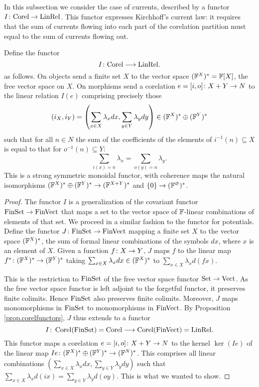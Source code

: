 In this subsection we consider the case of currents, described by a functor
$I{\colon} \mathrm{Corel} \to \mathrm{LinRel}$. This functor expresses Kirchhoff's
current law: it requires that the sum of currents flowing into each part of the
corelation partition must equal to the sum of currents flowing out.  
\begin{proposition}
  Define the functor
  \[
    I{\colon} \mathrm{Corel} \longrightarrow \mathrm{LinRel}.
  \]
  as follows. On objects send a finite set $X$ to the vector space
  $({\mathbb F}^{X})^\ast={\mathbb F}[X]$, the free vector space on $X$. On morphisms send a
  corelation $e=[i,o]{\colon} X +Y \to N$ to the linear relation $I(e)$ comprising precisely
  those 
  \[
    (i_X,i_Y) = \left(\sum_{x \in X} \lambda_xdx,\sum_{y \in Y}
    \lambda_ydy\right)  \in ({\mathbb F}^{X})^\ast \oplus ({\mathbb F}^{Y})^\ast
  \]
  such that for all $n \in N$ the sum of the coefficients of the elements
  of $i^{-1}(n) \subseteq X$ is equal to that for $o^{-1}(n) \subseteq Y$:
  \[
    \sum_{i(x)=n} \lambda_x = \sum_{o(y)=n} \lambda_y.
  \]
  This is a strong symmetric monoidal functor, with coherence maps the natural
  isomorphisms $({\mathbb F}^X)^\ast \oplus ({\mathbb F}^Y)^\ast \to ({\mathbb F}^{X+Y})^\ast$ and $\{0\}
  \to ({\mathbb F}^\varnothing)^\ast$.
\end{proposition}
\begin{proof}
  The functor $I$ is a generalization of the covariant functor $\mathrm{FinSet} \to
  \mathrm{FinVect}$ that maps a set to the vector space of ${\mathbb F}$-linear combinations of
  elements of that set. We proceed in a similar fashion to the functor for
  potentials. Define the functor $J{\colon} \mathrm{FinSet} \to \mathrm{FinVect}$ mapping a finite
  set $X$ to the vector space $({\mathbb F}^{X})^\ast$, the sum of formal linear
  combinations of the symbols $dx$, where $x$ is an element of $X$. Given a
  function $f{\colon} X \to Y$, $J$ maps $f$ to the linear map $f^\ast{\colon}
  ({\mathbb F}^X)^\ast \to ({\mathbb F}^Y)^\ast$ taking $\sum_{x \in X} \lambda_x dx \in
  ({\mathbb F}^X)^\ast$ to $\sum_{x \in X} \lambda_xd(fx)$.  

  This is the restriction to $\mathrm{FinSet}$ of the free vector space functor $\mathrm{Set}
  \to \mathrm{Vect}$. As the free vector space functor is left adjoint to the forgetful
  functor, it preserves finite colimits. Hence $\mathrm{FinSet}$ also preserves finite
  colimits. Moreover, $J$ maps monomorphisms in $\mathrm{FinSet}$ to monomorphisms in
  $\mathrm{FinVect}$. By Proposition \ref{prop.corelfunctors}, $J$ thus extends to a functor
  \[
    I{\colon} \operatorname{{Corel}}(\mathrm{FinSet}) = \mathrm{Corel} \longrightarrow \operatorname{{Corel}}(\mathrm{FinVect}) =
    \mathrm{LinRel}.
  \]
  This functor maps a corelation $e=[i,o]{\colon} X+Y \to N$ to the kernel
  $\ker(Ie)$ of the linear map $Ie{\colon} ({\mathbb F}^X)^\ast \oplus ({\mathbb F}^Y)^\ast \to
  ({\mathbb F}^N)^\ast$. This comprises all linear combinations $\left(\sum_{x \in X}
  \lambda_xdx,\sum_{y \in Y} \lambda_ydy\right)$ such that $\sum_{x \in X}
  \lambda_x d(ix) =  \sum_{y \in Y} \lambda_y d(oy)$. This is what we wanted to
  show.
\end{proof}


